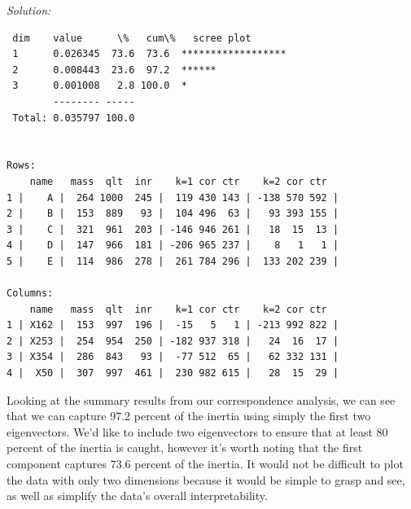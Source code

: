 \documentclass{article}
\newenvironment{solution}
    {\textit{Solution:}}
    {}
\begin{document}
\begin{solution}
\begin{enumerate}
\begin{lstlisting}
 dim    value      \%   cum\%   scree plot               
 1      0.026345  73.6  73.6  ******************       
 2      0.008443  23.6  97.2  ******                   
 3      0.001008   2.8 100.0  *                        
        -------- -----                                 
 Total: 0.035797 100.0                                 


Rows:
    name   mass  qlt  inr    k=1 cor ctr    k=2 cor ctr  
1 |    A |  264 1000  245 |  119 430 143 | -138 570 592 |
2 |    B |  153  889   93 |  104 496  63 |   93 393 155 |
3 |    C |  321  961  203 | -146 946 261 |   18  15  13 |
4 |    D |  147  966  181 | -206 965 237 |    8   1   1 |
5 |    E |  114  986  278 |  261 784 296 |  133 202 239 |

Columns:
    name   mass  qlt  inr    k=1 cor ctr    k=2 cor ctr  
1 | X162 |  153  997  196 |  -15   5   1 | -213 992 822 |
2 | X253 |  254  954  250 | -182 937 318 |   24  16  17 |
3 | X354 |  286  843   93 |  -77 512  65 |   62 332 131 |
4 |  X50 |  307  997  461 |  230 982 615 |   28  15  29 |
	\end{lstlisting}
Looking at the summary results from our correspondence analysis, we can see that we can capture 97.2 percent of the inertia using simply the first two eigenvectors. We'd like to include two eigenvectors to ensure that at least 80 percent of the inertia is caught, however it's worth noting that the first component captures 73.6 percent of the inertia. It would not be difficult to plot the data with only two dimensions because it would be simple to grasp and see, as well as simplify the data's overall interpretability.
\end{enumerate}
\end{solution}
\end{document}
